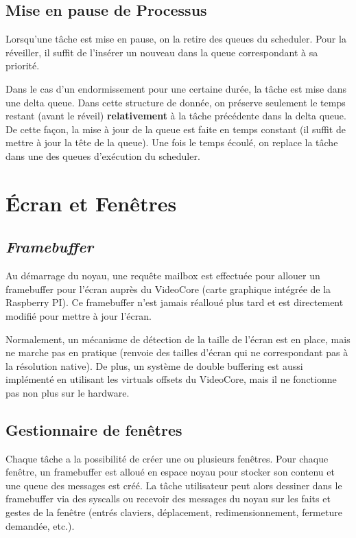 \documentclass[french, 12pt]{article}
\begin{document}
\subsection{Mise en pause de Processus}

Lorsqu'une tâche est mise en pause, on la retire des queues du scheduler. Pour la réveiller, il suffit de l'insérer un nouveau dans la queue correspondant à sa priorité.

Dans le cas d'un endormissement pour une certaine durée, la tâche est mise dans une delta queue. Dans cette structure de donnée, on préserve seulement le temps restant (avant le réveil) \textbf{relativement} à la tâche précédente dans la delta queue. De cette façon, la mise à jour de la queue est faite en temps constant (il suffit de mettre à jour la tête de la queue). Une fois le temps écoulé, on replace la tâche dans une des queues d'exécution du scheduler.

\section{Écran et Fenêtres}
\subsection{\textit{Framebuffer}}

Au démarrage du noyau, une requête mailbox est effectuée pour allouer un framebuffer pour l'écran auprès du VideoCore (carte graphique intégrée de la Raspberry PI). Ce framebuffer n'est jamais réalloué plus tard et est directement modifié pour mettre à jour l'écran.

Normalement, un mécanisme de détection de la taille de l'écran est en place, mais ne marche pas en pratique (renvoie des tailles d'écran qui ne correspondant pas à la résolution native). De plus, un système de double buffering est aussi implémenté en utilisant les virtuals offsets du VideoCore, mais il ne fonctionne pas non plus sur le hardware.

\subsection{Gestionnaire de fenêtres}

Chaque tâche a la possibilité de créer une ou plusieurs fenêtres. Pour chaque fenêtre, un framebuffer est alloué en espace noyau pour stocker son contenu et une queue des messages est créé. La tâche utilisateur peut alors dessiner dans le framebuffer via des syscalls ou recevoir des messages du noyau sur les faits et gestes de la fenêtre (entrés claviers, déplacement, redimensionnement, fermeture demandée, etc.).
\end{document}
